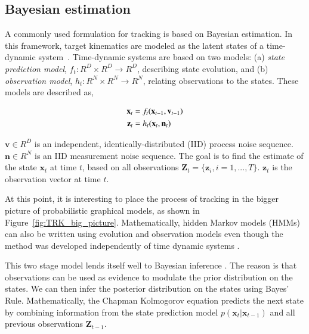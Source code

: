 \begin{Body}
\section{Bayesian estimation}
A commonly used formulation for tracking is based on Bayesian estimation.  In this framework, target kinematics are modeled as the latent states of a time-dynamic system~\cite{2002_JNL_PF_Arulampalam}.  Time-dynamic systems are based on two models: (a) \emph{state prediction model}, ${f_t:R^D \times R^D \rightarrow R^D}$, describing state evolution, and (b) \emph{observation model}, ${h_t:R^N \times R^N \rightarrow R^N}$, relating observations to the states.  These models are described as,

\begin{align}
\mathbf{x}_t &= f_t(\mathbf{x}_{t-1}, \mathbf{v}_{t-1}) \notag\\
\mathbf{z}_t &= h_t(\mathbf{x}_t, \mathbf{n}_t)
\label{Eq:TDS}
\end{align}

$\mathbf{v} \in R^D$ is an independent, identically-distributed (IID) process noise sequence.  $\mathbf{n} \in R^N$ is an IID measurement noise sequence.  The goal is to find the estimate of the state $\mathbf{x}_t$ at time $t$, based on all observations $\mathbf{Z}_t={\{\mathbf{z}_i, i=1,...,T\}}$.   $\mathbf{z}_t$ is the observation vector at time $t$.  

At this point, it is interesting to place the process of tracking in the bigger picture of probabilistic graphical models, as shown in Figure~\ref{fig:TRK_big_picture}.  Mathematically, hidden Markov models (HMMs) can also be written using evolution and observation models even though the method was developed independently of time dynamic systems \cite{2007_BOOK_PRML_Bishop}.  

This two stage model lends itself well to Bayesian inference \cite{2002_JNL_PF_Arulampalam}.  The reason is that observations can be used as evidence to modulate the prior distribution on the states.  We can then infer the posterior distribution on the states using Bayes' Rule.  Mathematically, the Chapman Kolmogorov equation predicts the next state by combining information from the state prediction model $p(\mathbf{x}_t| \mathbf{x}_{t-1})$ and all previous observations $\mathbf{Z}_{t-1}$.  %


\end{Body}
